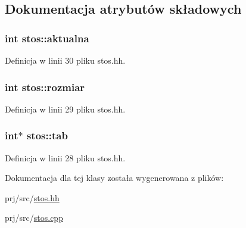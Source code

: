 \subsection{\-Dokumentacja atrybutów składowych}
\hypertarget{classstos_a5769bde313093eb321b0b15111c7ec35}{
\subsubsection[{aktualna}]{\setlength{\rightskip}{0pt plus 5cm}int {\bf stos\-::aktualna}}}\label{classstos_a5769bde313093eb321b0b15111c7ec35}


\-Definicja w linii 30 pliku stos.\-hh.

\hypertarget{classstos_aaccd7c15d97e23313862cca67f56f3ab}{
\subsubsection[{rozmiar}]{\setlength{\rightskip}{0pt plus 5cm}int {\bf stos\-::rozmiar}}}\label{classstos_aaccd7c15d97e23313862cca67f56f3ab}


\-Definicja w linii 29 pliku stos.\-hh.

\hypertarget{classstos_a71155717d44c2156515be8edb1139358}{
\subsubsection[{tab}]{\setlength{\rightskip}{0pt plus 5cm}int$\ast$ {\bf stos\-::tab}}}\label{classstos_a71155717d44c2156515be8edb1139358}


\-Definicja w linii 28 pliku stos.\-hh.



\-Dokumentacja dla tej klasy została wygenerowana z plików\-:\begin{DoxyCompactItemize}
\item 
prj/src/\hyperlink{stos_8hh}{stos.\-hh}\item 
prj/src/\hyperlink{stos_8cpp}{stos.\-cpp}\end{DoxyCompactItemize}
